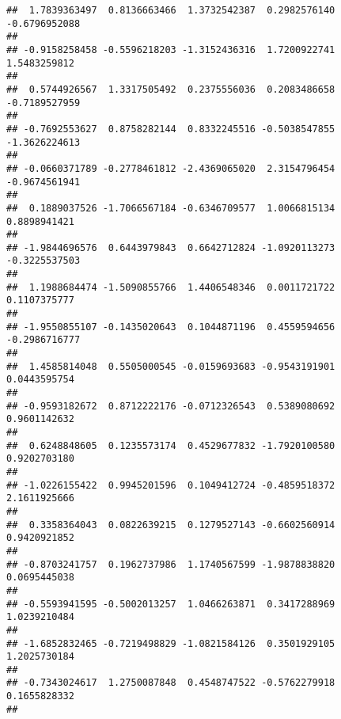 \documentclass[]{article}
\begin{document}
\begin{verbatim}
##  1.7839363497  0.8136663466  1.3732542387  0.2982576140 -0.6796952088 
##                                                                       
## -0.9158258458 -0.5596218203 -1.3152436316  1.7200922741  1.5483259812 
##                                                                       
##  0.5744926567  1.3317505492  0.2375556036  0.2083486658 -0.7189527959 
##                                                                       
## -0.7692553627  0.8758282144  0.8332245516 -0.5038547855 -1.3626224613 
##                                                                       
## -0.0660371789 -0.2778461812 -2.4369065020  2.3154796454 -0.9674561941 
##                                                                       
##  0.1889037526 -1.7066567184 -0.6346709577  1.0066815134  0.8898941421 
##                                                                       
## -1.9844696576  0.6443979843  0.6642712824 -1.0920113273 -0.3225537503 
##                                                                       
##  1.1988684474 -1.5090855766  1.4406548346  0.0011721722  0.1107375777 
##                                                                       
## -1.9550855107 -0.1435020643  0.1044871196  0.4559594656 -0.2986716777 
##                                                                       
##  1.4585814048  0.5505000545 -0.0159693683 -0.9543191901  0.0443595754 
##                                                                       
## -0.9593182672  0.8712222176 -0.0712326543  0.5389080692  0.9601142632 
##                                                                       
##  0.6248848605  0.1235573174  0.4529677832 -1.7920100580  0.9202703180 
##                                                                       
## -1.0226155422  0.9945201596  0.1049412724 -0.4859518372  2.1611925666 
##                                                                       
##  0.3358364043  0.0822639215  0.1279527143 -0.6602560914  0.9420921852 
##                                                                       
## -0.8703241757  0.1962737986  1.1740567599 -1.9878838820  0.0695445038 
##                                                                       
## -0.5593941595 -0.5002013257  1.0466263871  0.3417288969  1.0239210484 
##                                                                       
## -1.6852832465 -0.7219498829 -1.0821584126  0.3501929105  1.2025730184 
##                                                                       
## -0.7343024617  1.2750087848  0.4548747522 -0.5762279918  0.1655828332 
##                                                                       

\end{verbatim}
\end{document}
